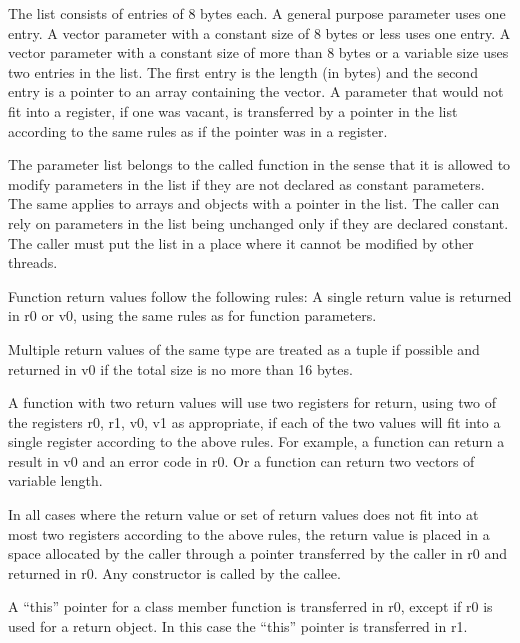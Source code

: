 \documentclass[forwardcom.tex]{subfiles}
\begin{document}
The list consists of entries of 8 bytes each. A general purpose parameter uses one entry. A vector parameter with a constant size of 8 bytes or less uses one entry. A vector parameter with a constant size of more than 8 bytes or a variable size uses two entries in the list. The first entry is the length (in bytes) and the second entry is a pointer to an array containing the vector. A parameter that would not fit into a register, if one was vacant, is transferred by a pointer in the list according to the same rules as if the pointer was in a register. 
\vspace{2mm}

The parameter list belongs to the called function in the sense that it is allowed to modify parameters in the list if they are not declared as constant parameters. The same applies to arrays and objects with a pointer in the list. The caller can rely on parameters in the list being unchanged only if they are declared constant. The caller must put the list in a place where it cannot be modified by other threads. 
\vspace{2mm}

Function return values follow the following rules:
A single return value is returned in r0 or v0, using the same rules as for function parameters.
\vspace{2mm}

Multiple return values of the same type are treated as a tuple if possible and returned in v0 if the total size is no more than 16 bytes.
\vspace{2mm}

A function with two return values will use two registers for return, using two of the registers r0, r1, v0, v1 as appropriate, if each of the two values will fit into a single register according to the above rules. For example, a function can return a result in v0 and an error code in r0. Or a function can return two vectors of variable length.
\vspace{2mm}

In all cases where the return value or set of return values does not fit into at most two registers according to the above rules, the return value is placed in a space allocated by the caller through a pointer transferred by the caller in r0 and returned in r0. Any constructor is called by the callee. 
\vspace{2mm}

A ``this'' pointer for a class member function is transferred in r0, except if r0 is used for a return object. In this case the ``this'' pointer is transferred in r1. 
\end{document}
